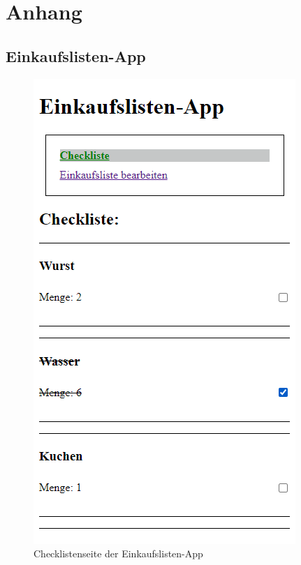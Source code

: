 

\chapter{Anhang}

\section*{Einkaufslisten-App}
\begin{figure}[h]
    \begin{minipage}[b]{.45\textwidth}
        \includegraphics[width=\textwidth]{img/vue-Einkaufsliste-Checkliste}
        \caption{Checklistenseite der Einkaufslisten-App}
        \label{fig:checklistenseite}


\end{minipage}
\end{figure}
